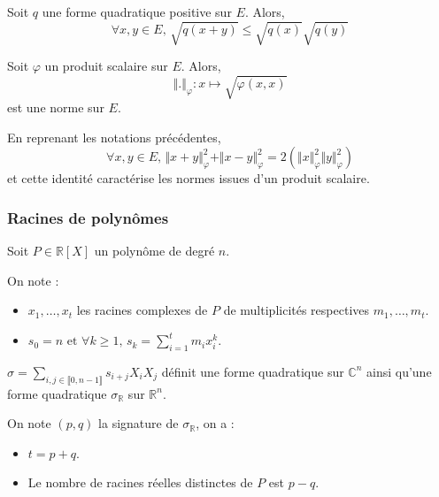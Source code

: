 	\begin{proposition}
		Soit $q$ une forme quadratique positive sur $E$. Alors,
		\[ \forall x, y \in E, \, \sqrt{q(x + y)} \leq \sqrt{q(x)} \sqrt{q(y)} \]
	\end{proposition}
	
	\begin{corollary}
		Soit $\varphi$ un produit scalaire sur $E$. Alors,
		\[ \Vert . \Vert_{\varphi} : x \mapsto \sqrt{\varphi(x, x)} \]
		est une norme sur $E$.
	\end{corollary}
	
	
	\begin{proposition}
		En reprenant les notations précédentes,
		\[ \forall x, y \in E, \, \Vert x + y \Vert_{\varphi}^2 + \Vert x - y \Vert_{\varphi}^2 = 2(\Vert x \Vert_{\varphi}^2 \Vert y \Vert_{\varphi}^2) \]
		et cette identité caractérise les normes issues d'un produit scalaire.
	\end{proposition}
	
	\subsubsection{Racines de polynômes}
	
	
	Soit $P \in \mathbb{R}[X]$ un polynôme de degré $n$.
	
	\begin{notation}
		On note :
		\begin{itemize}
			\item $x_1, \dots, x_t$ les racines complexes de $P$ de multiplicités respectives $m_1, \dots, m_t$.
			\item $s_0 = n \text{ et } \forall k \geq 1, \, s_k = \sum_{i=1}^t m_i x_i^k$.
		\end{itemize}
	\end{notation}
	
	\begin{proposition}
		$\sigma = \sum_{i, j \in \llbracket 0, n-1 \rrbracket} s_{i+j} X_i X_j$ définit une forme quadratique sur $\mathbb{C}^n$ ainsi qu'une forme quadratique $\sigma_{\mathbb{R}}$ sur $\mathbb{R}^n$.
	\end{proposition}
	
	
	\begin{theorem}
		On note $(p,q)$ la signature de $\sigma_{\mathbb{R}}$, on a :
		\begin{itemize}
			\item $t = p + q$.
			\item Le nombre de racines réelles distinctes de $P$ est $p-q$.
		\end{itemize}
	\end{theorem}
	
